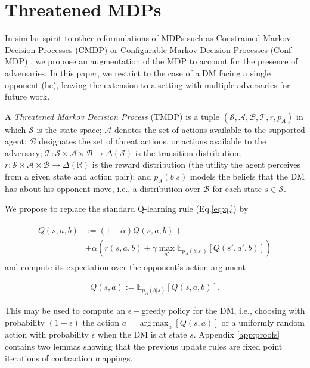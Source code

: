 \documentclass[letterpaper]{article} %
\DeclareMathOperator*{\argmax}{arg\,max}
\begin{document}
\section{Threatened MDPs}

In similar spirit to other reformulations of MDPs such as Constrained Markov Decision Processes (CMDP) \cite{altman1999constrained} or Configurable Markov Decision Processes (Conf-MDP) \cite{2018arXiv180605415M}, we propose an augmentation of the MDP
to account for the presence of adversaries. In this paper, we restrict to the case of a DM facing a single opponent (he), leaving the extension to
a setting with multiple adversaries for future work.

A \emph{Threatened Markov Decision Process} (TMDP) is a tuple $\left( \mathcal{S}, \mathcal{A}, \mathcal{B}, \mathcal{T}, r, p_A \right) $
in which $\mathcal{S}$ is the state space; $\mathcal{A}$ denotes the set of actions available to the supported agent; $\mathcal{B}$ designates the set of threat actions, or actions
available to the adversary; $\mathcal{T}: \mathcal{S} \times \mathcal{A} \times \mathcal{B} \rightarrow \Delta(\mathcal{S})$ is the transition distribution;
$r : \mathcal{S} \times \mathcal{A} \times \mathcal{B} \rightarrow \Delta(\mathbb{R}) $ is the reward distribution (the utility the agent perceives from a given state
and action pair);  and $p_A (b | s)$ models the beliefs that the DM has about
his opponent move, i.e., a distribution over $\mathcal{B}$ for each state $s \in \mathcal{S}$.

We propose to replace the standard Q-learning rule (Eq.\ref{eq:ql})  by

\begin{align}\label{eq:lr}
\begin{split}
Q(s, a, b) &:= (1 - \alpha)Q(s, a, b) + \\ &+ \alpha \left( r(s,a,b) + \gamma \max_{a'} \mathbb{E}_{p_A(b|s')} \left[ Q(s',a',b)  \right]  \right)
\end{split}
\end{align}
and compute its expectation over the opponent's action argument

\begin{align}
Q(s,a) := \mathbb{E}_{p_A(b|s)} \left[ Q(s,a,b) \right].
\end{align}

This may be used to compute an $\epsilon-$greedy policy for the DM, i.e., choosing
with probability $(1-\epsilon)$ the action $a = \argmax_a  \left[ Q(s,a)  \right] $ or a uniformly random action with probability $\epsilon$ when
the DM is at state $s$.
Appendix \ref{app:proofs} contains two lemmas showing
that the previous update rules are fixed point iterations of contraction mappings.
\end{document}
